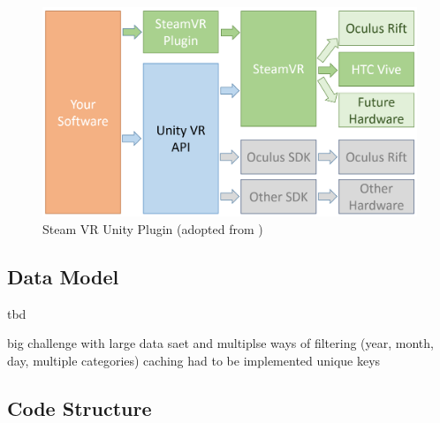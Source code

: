\begin{figure}[h]
	\begin{center}
		\includegraphics[width=14cm]{03_Figures/04_Valve/OpenVR_SteamVR_selected.png}
		\caption[Steam VR Unity Plugin]{Steam VR Unity Plugin (adopted from \cite{Valve2016})}
		\label{fig:steamvrselected}
	\end{center}
\end{figure}




\subsection{Data Model}

tbd

big challenge with large data saet and multiplse ways of filtering (year, month, day, multiple categories)
caching had to be implemented
unique keys



\subsection{Code Structure}

